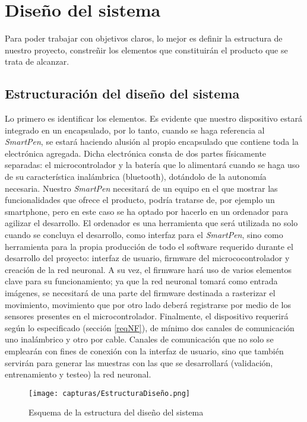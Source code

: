 \chapter{Diseño del sistema}
Para poder trabajar con objetivos claros, lo mejor es definir la estructura
de nuestro proyecto, constreñir los elementos que constituirán el producto
que se trata de alcanzar.

\section{Estructuración del diseño del sistema}
Lo primero es identificar los elementos. Es evidente que nuestro
dispositivo estará integrado en un encapsulado, por lo tanto, cuando se haga
referencia al \textit{SmartPen}, se estará haciendo alusión al propio encapsulado
que contiene toda la electrónica agregada. Dicha electrónica consta de dos partes
físicamente separadas: el microcontrolador y la batería que lo alimentará
cuando se haga uso de su característica inalámbrica (bluetooth), dotándolo de
la autonomía necesaria. Nuestro \textit{SmartPen} necesitará de un equipo en el
que mostrar las funcionalidades que ofrece el producto, podría tratarse de, por
ejemplo un smartphone, pero en este caso se ha optado por hacerlo en un ordenador
para agilizar el desarrollo. El ordenador es una herramienta que será utilizada
no solo cuando se concluya el desarrollo, como interfaz para el \textit{SmartPen},
sino como herramienta para la propia producción de todo el software requerido
durante el desarrollo del proyecto:
interfaz de usuario, firmware del micrococontrolador y creación de la red
neuronal. A su vez, el firmware hará uso de varios elementos clave para su
funcionamiento; ya que la red neuronal tomará como entrada imágenes, se
necesitará de una parte del firmware destinada a rasterizar el movimiento,
movimiento que por otro lado deberá registrarse por medio de los sensores
presentes en el microcontrolador. Finalmente, el dispositivo requerirá
según lo especificado (sección \ref{reqNF}), de mínimo dos canales de
comunicación uno inalámbrico y otro por cable. Canales de comunicación
que no solo se emplearán con fines de conexión con la interfaz de usuario,
sino que también servirán para generar las muestras con las que se
desarrollará (validación, entrenamiento y testeo) la red neuronal.

\begin{figure}[]
    \centering
    \texttt{[image: capturas/EstructuraDiseño.png]}\\[-0,20cm]
    \caption{Esquema de la estructura del diseño del sistema}
\end{figure}
